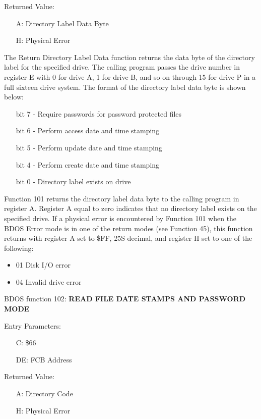 Returned Value:
\begin{itemize}
\item[] A: Directory Label Data Byte
\item[] H: Physical Error
\end{itemize}

The Return Directory Label Data function returns the data byte of the
directory label for the specified drive. The calling program passes
the drive number in register E with 0 for drive A, 1 for drive B, and
so on through 15 for drive P in a full sixteen drive system. The
format of the directory label data byte is shown below:

\begin{itemize}
\item[bit] 7 - Require passwords for password protected files
\item[bit] 6 - Perform access date and time stamping
\item[bit] 5 - Perform update date and time stamping
\item[bit] 4 - Perform create date and time stamping
\item[bit] 0 - Directory label exists on drive
\end{itemize}

Function 101 returns the directory label data byte to the calling
program in register A. Register A equal to zero indicates that no
directory label exists on the specified drive. If a physical error is
encountered by Function 101 when the BDOS Error mode is in one of the
return modes (see Function 45), this function returns with register A
set to \$FF, 25S decimal, and register H set to one of the following:

\begin{itemize}
\item 01 Disk I/O error
\item 04 Invalid drive error
\end{itemize}

BDOS function 102: \textbf{READ FILE DATE STAMPS AND PASSWORD MODE}

Entry Parameters:
\begin{itemize}
\item[] C: \$66
\item[] DE: FCB Address
\end{itemize}

Returned Value:
\begin{itemize}
\item[] A: Directory Code
\item[] H: Physical Error
\end{itemize}

